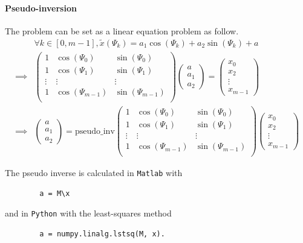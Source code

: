 \paragraph{Pseudo-inversion}
The problem can be set as a linear equation problem as follow.
\begin{align}
&\forall k \in [0,m-1], \tilde{x}(\Psi_k) = a_1 \cos(\Psi_k) + a_2 \sin(\Psi_k) + a \nonumber \\
%
\implies &
\begin{pmatrix}
1 & \cos(\Psi_0) & \sin(\Psi_0) \\
1 & \cos(\Psi_1) & \sin(\Psi_1) \\
\vdots & \vdots & \vdots \\
1 & \cos(\Psi_{m-1}) & \sin(\Psi_{m-1}) \\
\end{pmatrix}
\begin{pmatrix}
a \\ a_1 \\ a_2
\end{pmatrix}
=
\begin{pmatrix}
x_0 \\ x_2 \\ \vdots \\ x_{m-1}
\end{pmatrix} \nonumber
\\
%
\implies &
\begin{pmatrix}
a \\ a_1 \\ a_2
\end{pmatrix}
=
\mathrm{pseudo\_inv}
\begin{pmatrix}
1 & \cos(\Psi_0) & \sin(\Psi_0) \\
1 & \cos(\Psi_1) & \sin(\Psi_1) \\
\vdots & \vdots & \vdots \\
1 & \cos(\Psi_{m-1}) & \sin(\Psi_{m-1}) \\
\end{pmatrix}
\begin{pmatrix}
x_0 \\ x_2 \\ \vdots \\ x_{m-1}
\end{pmatrix}
\end{align}

The pseudo inverse is calculated in \texttt{Matlab} with
\begin{verbatim}
        a = M\x
\end{verbatim}
and in \texttt{Python} with the least-squares method
\begin{verbatim}
        a = numpy.linalg.lstsq(M, x).
\end{verbatim}

